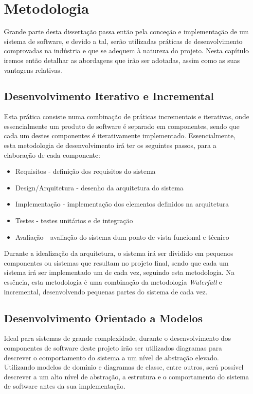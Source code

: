 \chapter{Metodologia}

Grande parte desta dissertação passa então pela conceção e implementação de um sistema de software, e devido a tal, serão utilizadas práticas de desenvolvimento comprovadas na indústria e que se adequem à natureza do projeto. Nesta capítulo iremos então detalhar as abordagens que irão ser adotadas, assim como as suas vantagens relativas.

\section{Desenvolvimento Iterativo e Incremental}

Esta prática consiste numa combinação de práticas incrementais e iterativas, onde essencialmente um produto de software é separado em componentes, sendo que cada um destes componentes é iterativamente implementado. Essencialmente, esta metodologia de desenvolvimento irá ter os seguintes passos, para a elaboração de cada componente:
\begin{itemize}
    \item Requisitos - definição dos requisitos do sistema
    \item Design/Arquitetura - desenho da arquitetura do sistema
    \item Implementação - implementação dos elementos definidos na arquitetura
    \item Testes - testes unitários e de integração
    \item Avaliação - avaliação do sistema dum ponto de vista funcional e técnico
\end{itemize}

Durante a idealização da arquitetura, o sistema irá ser dividido em pequenos componentes ou sistemas que resultam no projeto final, sendo que cada um sistema irá ser implementado um de cada vez, seguindo esta metodologia. Na essência, esta metodologia é uma combinação da metodologia \textit{Waterfall} e incremental, desenvolvendo pequenas partes do sistema de cada vez.

\section{Desenvolvimento Orientado a Modelos}

Ideal para sistemas de grande complexidade, durante o desenvolvimento dos componentes de software deste projeto irão ser utilizados diagramas para descrever o comportamento do sistema a um nível de abstração elevado. Utilizando modelos de domínio e diagramas de classe, entre outros, será possível descrever a um alto nível de abstração, a estrutura e o comportamento do sistema de software antes da sua implementação.

